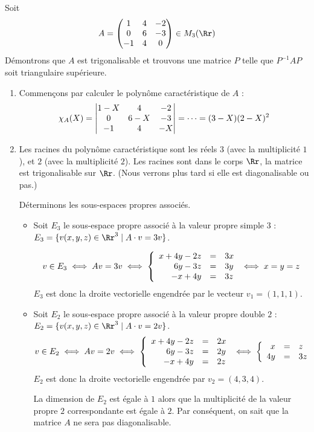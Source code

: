 \documentclass[12pt, class=report,crop=false]{standalone}
\begin{document}
\begin{exemple}
Soit $$A=\begin{pmatrix}1&4&-2\cr0&6&-3\cr-1&4&0\end{pmatrix} \in M_3(\Rr)$$
Démontrons que $A$ est trigonalisable et trouvons une matrice $P$ telle que $P^{-1}AP$ soit triangulaire supérieure.

\begin{enumerate}
  \item  Commençons par calculer le polynôme caractéristique de $A$ :
$$\chi_A(X)=\begin{vmatrix}1-X&4&-2\cr 0&6-X&-3\cr-1&4&-X\end{vmatrix}=\cdots=(3-X)(2-X)^2$$


  \item Les racines du polynôme caractéristique sont les réels $3$ (avec la multiplicité $1$), et $2$ (avec la multiplicité $2$). Les racines sont dans le corps $\Rr$, la matrice est trigonalisable sur $\Rr$. (Nous verrons plus tard si elle est diagonalisable ou pas.)

Déterminons les sous-espaces propres associés.
  \begin{itemize}
    \item Soit $E_3$ le sous-espace propre associé à la valeur propre simple $3$ :
$E_3=\{v(x,y,z)\in\Rr^3 \mid A \cdot v = 3v\}$.

$$v\in E_3 
\iff Av = 3v \iff \left\{\begin{array}{rcl}
x+4y-2z&=&3x\cr 
6y-3z&=&3y\cr 
-x+4y&=&3z
\end{array}\right.\iff x=y=z$$
$E_3$ est donc la droite vectorielle engendrée par le vecteur $v_1=(1,1,1)$.

    \item Soit $E_2$ le sous-espace propre associé à la valeur propre double $2$ :
$E_2=\{v(x,y,z)\in\Rr^3 \mid A \cdot v = 2v\}$.
$$v\in E_2\iff Av = 2v \iff  
\left\{\begin{array}{rcl}
x+4y-2z&=&2x\cr
6y-3z&=&2y\cr
-x+4y&=&2z
\end{array}\right.\iff \left\{\begin{array}{rcl}x&=&z\cr 4y&=&3z\end{array}\right.$$
$E_2$ est donc la droite vectorielle engendrée par $v_2=(4,3,4)$.

La dimension de $E_2$ est égale à $1$ alors que la multiplicité de la valeur propre $2$ correspondante est égale à $2$. Par conséquent, on sait que la matrice $A$ ne sera pas diagonalisable.


\end{itemize}
\end{enumerate}
\end{exemple}
\end{document}

